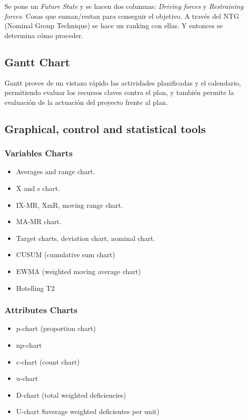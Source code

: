 \documentclass[]{article}
\begin{document}
Se pone un \textit{Future State} y se hacen dos columnas: \textit{Driving forces} y \textit{Restraining forces}. Cosas que suman/restan para conseguir el objetivo. A través del NTG (Nominal Group Technique) se hace un ranking con ellas. Y entonces se determina cómo proceder.

\subsection{Gantt Chart}

Gantt provee de un vistazo rápido las actividades planificadas y el calendario, permitiendo evaluar los recursos claves contra el plan, y también permite la evaluación de la actuación del proyecto frente al plan.

\subsection{Graphical, control and statistical tools}

\subsubsection{Variables Charts}

\begin{itemize}
	\item Averages and range chart.
	\item X and s chart.
	\item IX-MR, XmR, moving range chart.
	\item MA-MR chart.
	\item Target charts, deviation chart, nominal chart.
	\item CUSUM (cumulative sum chart)
	\item EWMA (weighted moving average chart)
	\item Hotelling T2
\end{itemize}

\subsubsection{Attributes Charts}

\begin{itemize}
	\item p-chart (proportion chart)
	\item np-chart
	\item c-chart (count chart)
	\item u-chart
	\item D-chart (total weighted deficiencies)
	\item U-chart 8average weighted deficientes per unit)
\end{itemize}
\end{document}
